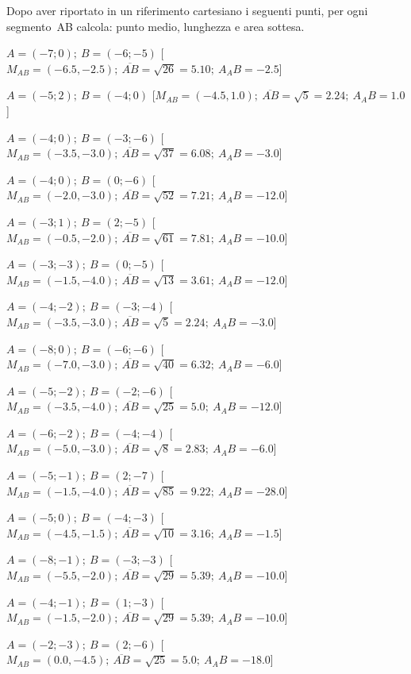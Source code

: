 \begin{esercizio}\label{ese:03.2}
Dopo aver riportato in un riferimento cartesiano i seguenti punti,
per ogni segmento~AB calcola: punto medio, lunghezza e area sottesa.
 \begin{enumeratea}
  \item $ A=(-7; 0); ~B=(-6; -5)$ \hfill
  [$M_{AB}=(-6.5, -2.5); ~\overline{AB}=\sqrt{26}=5.10; ~A_AB=-2.5$]
  \item $ A=(-5; 2); ~B=(-4; 0)$ \hfill 
  [$M_{AB}=(-4.5, 1.0); ~\overline{AB}=\sqrt{5}=2.24; ~A_AB=1.0$]
  \item $ A=(-4; 0); ~B=(-3; -6)$ \hfill 
  [$M_{AB}=(-3.5, -3.0); ~\overline{AB}=\sqrt{37}=6.08; ~A_AB=-3.0$]
  \item $ A=(-4; 0); ~B=(0; -6)$ \hfill 
  [$M_{AB}=(-2.0, -3.0); ~\overline{AB}=\sqrt{52}=7.21; ~A_AB=-12.0$]
  \item $ A=(-3; 1); ~B=(2; -5)$ \hfill 
  [$M_{AB}=(-0.5, -2.0); ~\overline{AB}=\sqrt{61}=7.81; ~A_AB=-10.0$]
  \item $ A=(-3; -3); ~B=(0; -5)$ \hfill 
  [$M_{AB}=(-1.5, -4.0); ~\overline{AB}=\sqrt{13}=3.61; ~A_AB=-12.0$]
  \item $ A=(-4; -2); ~B=(-3; -4)$ \hfill 
  [$M_{AB}=(-3.5, -3.0); ~\overline{AB}=\sqrt{5}=2.24; ~A_AB=-3.0$]
  \item $ A=(-8; 0); ~B=(-6; -6)$ \hfill 
  [$M_{AB}=(-7.0, -3.0); ~\overline{AB}=\sqrt{40}=6.32; ~A_AB=-6.0$]
  \item $ A=(-5; -2); ~B=(-2; -6)$ \hfill 
  [$M_{AB}=(-3.5, -4.0); ~\overline{AB}=\sqrt{25}=5.0; ~A_AB=-12.0$]
  \item $ A=(-6; -2); ~B=(-4; -4)$ \hfill 
  [$M_{AB}=(-5.0, -3.0); ~\overline{AB}=\sqrt{8}=2.83; ~A_AB=-6.0$]
  \item $ A=(-5; -1); ~B=(2; -7)$ \hfill 
  [$M_{AB}=(-1.5, -4.0); ~\overline{AB}=\sqrt{85}=9.22; ~A_AB=-28.0$]
  \item $ A=(-5; 0); ~B=(-4; -3)$ \hfill 
  [$M_{AB}=(-4.5, -1.5); ~\overline{AB}=\sqrt{10}=3.16; ~A_AB=-1.5$]
  \item $ A=(-8; -1); ~B=(-3; -3)$ \hfill 
  [$M_{AB}=(-5.5, -2.0); ~\overline{AB}=\sqrt{29}=5.39; ~A_AB=-10.0$]
  \item $ A=(-4; -1); ~B=(1; -3)$ \hfill 
  [$M_{AB}=(-1.5, -2.0); ~\overline{AB}=\sqrt{29}=5.39; ~A_AB=-10.0$]
  \item $ A=(-2; -3); ~B=(2; -6)$ \hfill 
  [$M_{AB}=(0.0, -4.5); ~\overline{AB}=\sqrt{25}=5.0; ~A_AB=-18.0$] 
 \end{enumeratea}
\end{esercizio}

